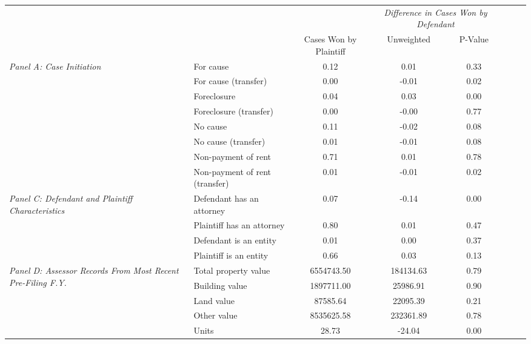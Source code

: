 \begin{tabular}{llcccccc}
\toprule
 &  & \textit{} & \multicolumn{2}{c}{\textit{Difference in Cases Won by Defendant}} \\
 &  & Cases Won by Plaintiff & Unweighted & P-Value \\
\midrule
\multirow[c]{8}{4cm}{\textit{Panel A: Case Initiation}} & For cause & 0.12 & 0.01 & 0.33 \\
 & For cause (transfer) & 0.00 & -0.01 & 0.02 \\
 & Foreclosure & 0.04 & 0.03 & 0.00 \\
 & Foreclosure (transfer) & 0.00 & -0.00 & 0.77 \\
 & No cause & 0.11 & -0.02 & 0.08 \\
 & No cause (transfer) & 0.01 & -0.01 & 0.08 \\
 & Non-payment of rent & 0.71 & 0.01 & 0.78 \\
 & Non-payment of rent (transfer) & 0.01 & -0.01 & 0.02 \\
\cline{1-5}
\multirow[c]{4}{4cm}{\textit{Panel C: Defendant and Plaintiff Characteristics}} & Defendant has an attorney & 0.07 & -0.14 & 0.00 \\
 & Plaintiff has an attorney & 0.80 & 0.01 & 0.47 \\
 & Defendant is an entity & 0.01 & 0.00 & 0.37 \\
 & Plaintiff is an entity & 0.66 & 0.03 & 0.13 \\
\cline{1-5}
\multirow[c]{5}{4cm}{\textit{Panel D: Assessor Records From Most Recent Pre-Filing F.Y.}} & Total property value & 6554743.50 & 184134.63 & 0.79 \\
 & Building value & 1897711.00 & 25986.91 & 0.90 \\
 & Land value & 87585.64 & 22095.39 & 0.21 \\
 & Other value & 8535625.58 & 232361.89 & 0.78 \\
 & Units & 28.73 & -24.04 & 0.00 \\
\cline{1-5}
\bottomrule
\end{tabular}
